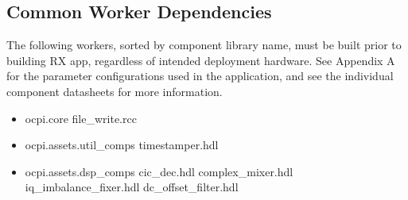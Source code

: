 \subsection{Common Worker Dependencies}
The following workers, sorted by component library name, must be built prior to building RX app, regardless of intended deployment hardware. See Appendix A for the parameter configurations used in the application, and see the individual component datasheets for more information.\par\bigskip
	\begin{minipage}[t]{.5\textwidth}
	\begin{itemize}
		\item ocpi.core
			\subitem file\_write.rcc
		\item ocpi.assets.util\_comps
			\subitem timestamper.hdl
		\item ocpi.assets.dsp\_comps
			\subitem cic\_dec.hdl
			\subitem complex\_mixer.hdl
			\subitem iq\_imbalance\_fixer.hdl
			\subitem dc\_offset\_filter.hdl
	\end{itemize}
	\end{minipage}


